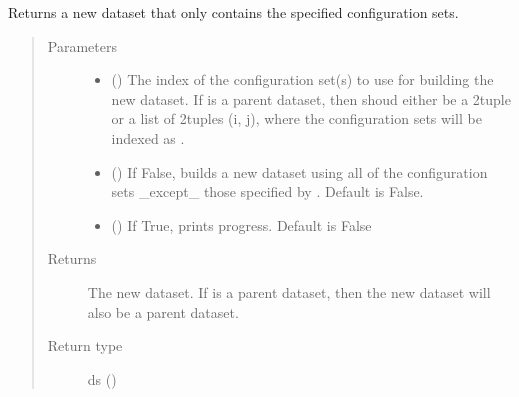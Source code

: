 \documentclass[letterpaper,10pt,english]{sphinxmanual}
\begin{document}
\begin{fulllineitems}
\begin{fulllineitems}
\label{\detokenize{dataset:colabfit.tools.dataset.Dataset.dataset_from_config_sets}}
\sphinxAtStartPar
Returns a new dataset that only contains the specified configuration
sets.
\begin{quote}\begin{description}
\item[{Parameters}] \leavevmode\begin{itemize}
\item {} 
\sphinxAtStartPar
{} () \textendash{} The index of the configuration set(s) to use for building the
new dataset. If  is a parent dataset, then  shoud
either be a 2\sphinxhyphen{}tuple or a list of 2\sphinxhyphen{}tuples (i, j), where the
configuration sets will be indexed as
.

\item {} 
\sphinxAtStartPar
{} () \textendash{} If False, builds a new dataset using all of the configuration
sets \_except\_ those specified by . Default is False.

\item {} 
\sphinxAtStartPar
{} () \textendash{} If True, prints progress. Default is False

\end{itemize}

\item[{Returns}] \leavevmode
\sphinxAtStartPar
The new dataset. If  is a parent dataset, then the new
dataset will also be a parent dataset.

\item[{Return type}] \leavevmode
\sphinxAtStartPar
ds ({\hyperref[\detokenize{dataset:colabfit.tools.dataset.Dataset}]{}})


\end{description}
\end{quote}
\end{fulllineitems}
\end{fulllineitems}
\end{document}

